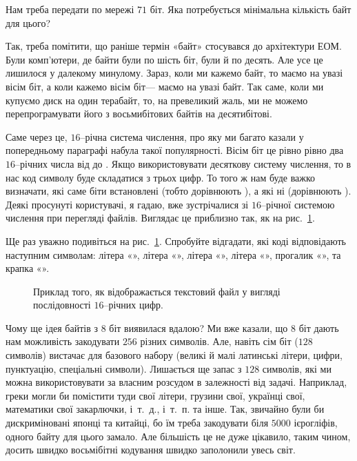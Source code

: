 \begin{exercise}
Нам треба передати по мережі $71$ біт. Яка потребується мінімальна кількість байт для цього?
\end{exercise}

Так, треба помітити, що раніше термін «байт» стосувався до архітектури ЕОМ.
Були комп'ютери, де байти були по шість біт, були й по десять.
Але усе це лишилося у далекому минулому.
Зараз, коли ми кажемо байт, то маємо на увазі вісім біт, а коли кажемо вісім біт--- маємо на увазі байт.
Так саме, коли ми купуємо диск на один терабайт, то, на превеликий жаль, ми не можемо перепрограмувати його з восьмибітових байтів на десятибітові.

Саме через це, $16$--річна система числення, про яку ми багато казали у попередньому параграфі набула такої популярності.
Вісім біт це рівно рівно два $16$--річних числа від  до .
Якщо використовувати десяткову систему числення, то в нас код символу буде складатися з трьох цифр.
То того ж нам буде важко визначати, які саме біти встановлені (тобто дорівнюють ), а які ні (дорівнюють ).
Деякі просунуті користувачі, я гадаю, вже зустрічалися зі $16$--річної системою числення при перегляді файлів.
Виглядає це приблизно так, як на рис.~\ref{PicHexDump}.

\begin{exercise}
Ще раз уважно подивіться на рис.~\ref{PicHexDump}. Спробуйте відгадати, які коді відповідають наступним символам:
літера «»,
літера «»,
літера «»,
літера «»,
прогалик «\bitstr{~}»,
та крапка «».
\end{exercise}

\begin{figure}[t]
  \centering
  
  \caption{Приклад того, як відображається текстовий файл у вигляді послідовності $16$--річних цифр.}
  \label{PicHexDump}
\end{figure}

Чому ще ідея байтів з $8$ біт виявилася вдалою?
Ми вже казали, що $8$ біт дають нам можливість закодувати $256$ різних символів.
Але, навіть  сім біт ($128$ символів) вистачає для базового набору (великі й малі латинські літери, цифри, пунктуацію, спеціальні символи).
Лишається ще запас з $128$ символів, які ми можна використовувати за власним розсудом в залежності від задачі.
Наприклад, греки могли би помістити туди свої літери, грузини свої, українці свої, математики свої закарлючки, і~т.~д., і~т.~п. та інше.
Так, звичайно були би дискриміновані японці та китайці, бо їм треба закодувати біля $5000$ ієрогліфів, одного байту для цього замало.
Але більшість це не дуже цікавило, таким чином, досить швидко восьмібітні кодування швидко заполонили увесь світ.

